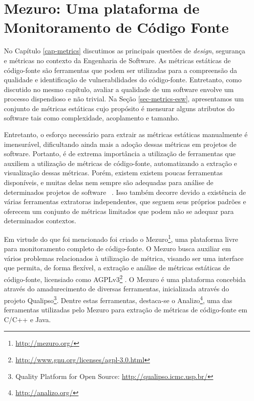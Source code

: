 \chapter{Mezuro: Uma plataforma de Monitoramento de Código Fonte}
\label{cap-mezuro}

No Capítulo \ref{cap-metrics} discutimos as principais questões de \emph{design}, segurança e métricas no contexto da Engenharia de Software. As métricas estáticas de código-fonte são ferramentas que podem ser utilizadas para a compreensão da qualidade e identificação de vulnerabilidades do código-fonte. Entretanto, como discutido no mesmo capítulo, avaliar a qualidade de um software envolve um processo dispendioso e não trivial. Na Seção \ref{sec-metrics-esw}, apresentamos um conjunto de métricas estáticas cujo propósito é mensurar alguns atributos do software tais como complexidade, acoplamento e tamanho. 

%

Entretanto, o esforço necessário para extrair as métricas estáticas manualmente é imensurável, dificultando ainda mais a adoção dessas métricas em projetos de software. Portanto, é de extrema importância a utilização de ferramentas que auxiliem a utilização de métricas de código-fonte, automatizando a extração e visualização dessas métricas. Porém, existem existem poucas ferramentas disponíveis, e muitas delas nem sempre são adequadas para análise de determinados projetos de software ~\cite{meirelles2010mezuro}. Isso também decorre devido a existência de várias ferramentas extratoras independentes, que seguem seus próprios padrões e oferecem um conjunto de métricas limitados que podem não se adequar para determinados contextos.

%

Em virtude do que foi mencionado foi criado o Mezuro\footnote{\url{http://mezuro.org/}}, uma plataforma livre para monitoramento completo de código-fonte. O Mezuro busca auxiliar em vários problemas relacionados à utilização de métrica, visando ser uma interface que permita, de forma flexível, a extração e análise de métricas estáticas de código-fonte, licensiado como AGPLv3\footnote{\url{http://www.gnu.org/licenses/agpl-3.0.html}} \cite{manzo2014}. O Mezuro é uma plataforma concebida através do amadurecimento de diversas ferramentas, inicializada através do projeto Qualipso\footnote{Quality Platform for Open Source: \url{http://qualipso.icmc.usp.br/}}. Dentre estas ferramentas, destaca-se o Analizo\footnote{\url{http://analizo.org/}}, uma das ferramentas utilizadas pelo Mezuro para extração de métricas de código-fonte em C/C++ e Java.

